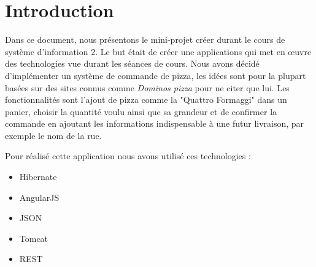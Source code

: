 \section{Introduction}
\setcounter{page}{1}
Dans ce document, nous présentons le mini-projet créer durant le cours de système d'information 2. Le but était de créer une applications qui met en œuvre des technologies vue durant les séances de cours.
Nous avons décidé d'implémenter un système de commande de pizza, les idées sont pour la plupart basées sur des sites connus comme \textit{Dominos pizza} pour ne citer que lui. Les fonctionnalités sont l'ajout de pizza comme la "Quattro Formaggi" dans un panier, choisir la quantité voulu ainsi que sa grandeur et de confirmer la commande en ajoutant les informations indispensable à une futur livraison, par exemple le nom de la rue.

Pour réalisé cette application nous avons utilisé ces technologies :
\begin{itemize}
\item Hibernate
\item AngularJS
\item JSON
\item Tomcat
\item REST
\end{itemize}